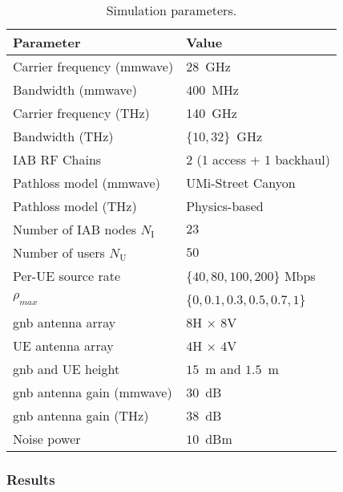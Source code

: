 \begin{table}[]
\caption{Simulation parameters.}
\label{Tab:parameters-iab-thz}
\centering
\footnotesize
\begin{tabular}{l|l}
    \toprule
    Parameter & Value \\ \midrule

    Carrier frequency (\gls{mmwave}) & $28$~GHz \\
    Bandwidth (\gls{mmwave}) & $400$~MHz \\
    Carrier frequency (THz) & 140~GHz  \\
    Bandwidth (THz) & $\{ 10,32 \}$~GHz \\
    IAB RF Chains & 2 (1 access + 1 backhaul) \\
    Pathloss model (\gls{mmwave}) & UMi-Street Canyon~\cite{3gpp.38.901} \\
    Pathloss model (THz) &  Physics-based~\cite{5995306} \\
    Number of IAB nodes $N_{\mathrm{I}}$ & $23$  \\
    Number of users $N_{\mathrm{U}}$ & $50$   \\
    Per-UE source rate & \{$40, 80, 100, 200$\} Mbps \\
    $\rho_{max}$ & \{$0, 0.1, 0.3, 0.5, 0.7, 1$\} \\
    \gls{gnb} antenna array & $8$H $\times$ $8$V\\
    UE antenna array & $4$H $\times$ $4$V\\
    \gls{gnb} and UE height & $15$~m and $1.5$~m \\
    \gls{gnb} antenna gain (\gls{mmwave}) & $30$~dB \\
    \gls{gnb} antenna gain (THz) & $38$~dB \\
    Noise power & $10$~dBm \\
\bottomrule
\end{tabular}
\end{table}



\subsubsection{Results}
\label{sub:results-iab-thz}

